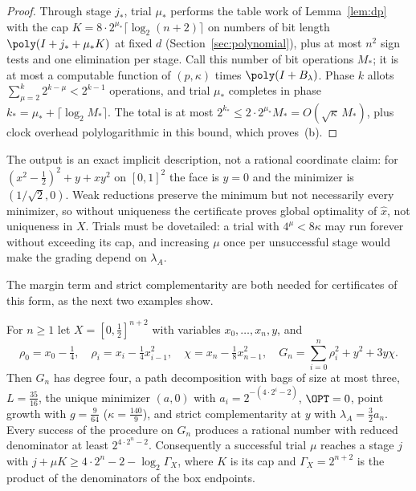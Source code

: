 \begin{proof}
Through stage $j_*$, trial $\mu_*$ performs the table work of
Lemma~\ref{lem:dp} with the cap $K=8\cdot2^{\mu_*}\lceil\log_2(n+2)\rceil$ on
numbers of bit length $\poly(I+j_*+\mu_*K)$ at fixed $d$
(Section~\ref{sec:polynomial}), plus at most $n^2$ sign tests and one
elimination per stage. Call this number of bit operations $M_*$; it is at
most a computable function of $(p,\kappa)$ times $\poly(I+B_\lambda)$. Phase
$k$ allots $\sum_{\mu=2}^k2^{k-\mu}<2^{k-1}$ operations, and trial $\mu_*$
completes in phase $k_*=\mu_*+\lceil\log_2M_*\rceil$. The total is at most
$2^{k_*}\le2\cdot2^{\mu_*}M_*=O(\sqrt\kappa\,M_*)$, plus clock overhead
polylogarithmic in this bound, which proves~(b).
\end{proof}

The output is an exact implicit description, not a rational coordinate claim:
for $(x^2-\frac12)^2+y+xy^2$ on $[0,1]^2$ the face is $y=0$ and the minimizer
is $(1/\sqrt2,0)$. Weak reductions preserve the minimum but not necessarily
every minimizer, so without uniqueness the certificate proves global
optimality of $\hat x$, not uniqueness in $X$. Trials must be dovetailed: a
trial with $4^\mu<8\kappa$ may run forever without exceeding its cap, and
increasing $\mu$ once per unsuccessful stage would make the grading depend on
$\lambda_A$.

The margin term and strict complementarity are both needed for certificates
of this form, as the next two examples show.

\begin{proposition}\label{prop:margin}
For $n\ge1$ let $X=[0,\frac12]^{n+2}$ with variables $x_0,\ldots,x_n,y$, and
\[
\rho_0=x_0-\tfrac14,\quad \rho_i=x_i-\tfrac14x_{i-1}^2,\quad
\chi=x_n-\tfrac18x_{n-1}^2,\quad
G_n=\sum_{i=0}^n\rho_i^2+y^2+3y\chi.
\]
Then $G_n$ has degree four, a path decomposition with bags of size at most
three, $L=\frac{35}{16}$, the unique minimizer $(a,0)$ with
$a_i=2^{-(4\cdot2^i-2)}$, $\OPT=0$, point growth with $g=\frac9{64}$
($\kappa=\frac{140}9$), and strict complementarity at $y$ with
$\lambda_A=\frac32a_n$. Every success of the procedure on $G_n$ produces a
rational number with reduced denominator at least $2^{4\cdot2^n-2}$.
Consequently a successful trial $\mu$ reaches a stage $j$ with
$j+\mu K\ge4\cdot2^n-2-\log_2\Gamma_X$, where $K$ is its cap and
$\Gamma_X=2^{n+2}$ is the product of the denominators of the box endpoints.
\end{proposition}

